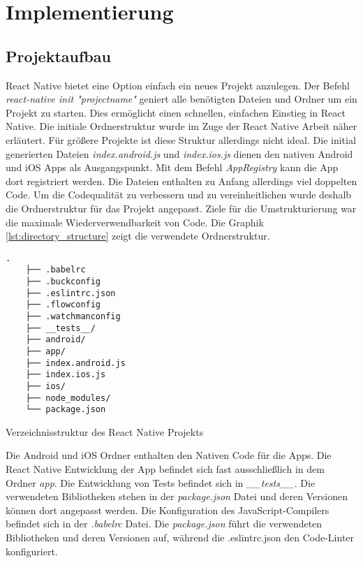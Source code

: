 \section{Implementierung}

    \subsection{Projektaufbau}
React Native bietet eine Option einfach ein neues Projekt anzulegen. Der Befehl \textit{react-native init "projectname"} geniert alle benötigten Dateien und Ordner um ein Projekt zu starten. Dies ermöglicht einen schnellen, einfachen Einstieg in React Native. Die initiale Ordnerstruktur wurde im Zuge der React Native Arbeit näher erläutert. Für größere Projekte ist diese Struktur allerdings nicht ideal. Die initial generierten Dateien \textit{index.android.js} und \textit{index.ios.js} dienen den nativen Android und iOS Apps als Ausgangspunkt. Mit dem Befehl \textit{AppRegistry} kann die App dort registriert werden. Die Dateien enthalten zu Anfang allerdings viel doppelten Code. Um die Codequalität zu verbessern und zu vereinheitlichen wurde deshalb die Ordnerstruktur für das Projekt angepasst. Ziele für die Umstrukturierung war die maximale Wiederverwendbarkeit von Code. Die Graphik \ref{lst:directory_structure} zeigt die verwendete Ordnerstruktur.

    
    \begin{lstlisting}[style=tree]
    .
    ├── .babelrc
    ├── .buckconfig
    ├── .eslintrc.json
    ├── .flowconfig
    ├── .watchmanconfig
    ├── __tests__/
    ├── android/
    ├── app/
    ├── index.android.js
    ├── index.ios.js
    ├── ios/
    ├── node_modules/
    └── package.json
    \end{lstlisting}
    \vspace{-0.5 cm}
    \begin{listing}[H]
        \caption{Verzeichnisstruktur des React Native Projekts}
        \label{lst:directory_structure}
    \end{listing}
    
 Die Android und iOS Ordner enthalten den Nativen Code für die Apps. Die React Native Entwicklung der App befindet sich fast ausschließlich in dem Ordner \textit{app}. Die Entwicklung von Tests befindet sich in \textit{\_\_tests\_\_}. Die verwendeten Bibliotheken stehen in der \textit{package.json} Datei und deren Versionen können dort angepasst werden. Die Konfiguration des JavaScript-Compilers befindet sich in der \textit{.babelrc} Datei. Die \textit{package.json} führt die verwendeten Bibliotheken und deren Versionen auf, während die .eslintrc.json den Code-Linter konfiguriert.
 
